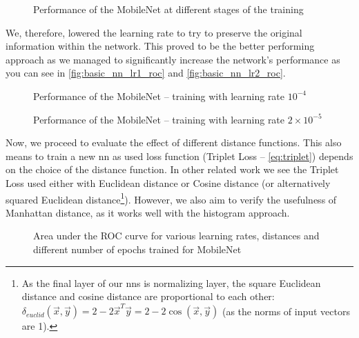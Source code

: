 \begin{figure}
    \centering
    \def\svgwidth{\columnwidth}
    
    \caption{Performance of the MobileNet at different stages of the training}
    \label{fig:basic_nn_overfit_roc}
\end{figure}

We, therefore, lowered the learning rate to try to preserve the original information within the network. This proved to be the better performing approach as we managed to significantly increase the network's performance as you can see in \autoref{fig:basic_nn_lr1_roc} and \autoref{fig:basic_nn_lr2_roc}.

\begin{figure}
    \centering
    \def\svgwidth{\columnwidth}
    
    \caption{Performance of the MobileNet -- training with learning rate $10^{-4}$}
    \label{fig:basic_nn_lr1_roc}
\end{figure}

\begin{figure}
    \centering
    \def\svgwidth{\columnwidth}
    
    \caption{Performance of the MobileNet -- training with learning rate $2 \times 10^{-5}$}
    \label{fig:basic_nn_lr2_roc}
\end{figure}

Now, we proceed to evaluate the effect of different distance functions. This also means to train a new \gls{nn} as used loss function (Triplet Loss -- \autoref{eq:triplet}) depends on the choice of the distance function. In other related work we see the Triplet Loss used either with Euclidean distance or Cosine distance (or alternatively squared Euclidean distance\footnote{As the final layer of our \glspl{nn} is normalizing layer, the square Euclidean distance and cosine distance are proportional to each other: $\delta_{euclid}(\vec{x}, \vec{y}) = 2 - 2\vec{x}^T\vec{y} = 2 - 2 \cos(\vec{x}, \vec{y})$ (as the norms of input vectors are 1).}). However, we also aim to verify the usefulness of Manhattan distance, as it works well with the histogram approach.

\begin{figure}
    \centering
    \large
    \def\svgwidth{\columnwidth}
    \scalebox{0.8}{}
    \vspace{1cm}
    
    \def\svgwidth{\columnwidth}
    \scalebox{0.8}{}
    \caption{Area under the ROC curve for various learning rates, distances and different number of epochs trained for MobileNet}
    \label{fig:lr_heatmap}
\end{figure}

